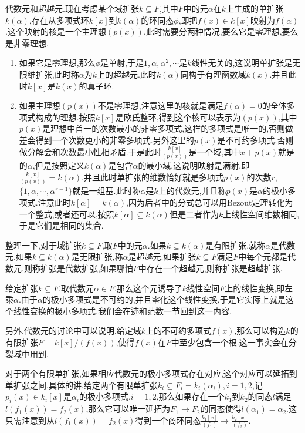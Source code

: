 代数元和超越元.现在考虑某个域扩张$k\subseteq F$,其中$F$中的元$\alpha$在$k$上生成的单扩张$k(\alpha)$,存在从多项式环$k[x]$到$k(\alpha)$的环同态$\phi$,即把$f(x)\in k[x]$映射为$f(\alpha)$.这个映射的核是一个主理想$(p(x))$,此时需要分两种情况,要么它是零理想,要么是非零理想.
\begin{enumerate}
	\item 如果它是零理想,那么$\phi$是单射,于是$1,\alpha,\alpha^2,\cdots$是$k$线性无关的,这说明单扩张是无限维扩张,此时称$\alpha$为$k$上的超越元.此时$k(\alpha)$同构于有理函数域$k(x)$.并且此时$k[x]$是$k(x)$的真子环.
	\item 如果主理想$(p(x))$不是零理想,注意这里的核就是满足$f(\alpha)=0$的全体多项式构成的理想.按照$k[x]$是欧氏整环,得到这个核可以表示为$(p(x))$,其中$p(x)$是理想中首一的次数最小的非零多项式,这样的多项式是唯一的,否则做差会得到一个次数更小的非零多项式.另外这里的$p(x)$是不可约多项式,否则做分解会和次数最小性相矛盾.于是此时$\frac{k[x]}{(p(x))}$是一个域,其中$x+p(x)$就是的$\alpha$,但是按照定义$k(\alpha)$是包含$\alpha$的最小域,这说明映射是满射,即$\frac{k[x]}{(p(x))}=k(\alpha)$.并且此时单扩张的维数恰好就是多项式$p(x)$的次数$r$,$\{1,\alpha,\cdots,\alpha^{r-1}\}$就是一组基.此时称$\alpha$是$k$上的代数元,并且称$p(x)$是$\alpha$的极小多项式.注意此时$k[\alpha]=k(\alpha)$,因为后者中的分式总可以用Bezout定理转化为一个整式,或者还可以,按照$k[\alpha]\subseteq k(\alpha)$但是二者作为$k$上线性空间维数相同,于是它们是相同的集合.
\end{enumerate}

整理一下,对于域扩张$k\subseteq F$,取$F$中的元$\alpha$.如果$k\subseteq k(\alpha)$是有限扩张,就称$\alpha$是代数元.如果$k\subseteq k(\alpha)$是无限扩张,称$\alpha$是超越元.如果扩张$k\subseteq F$满足$F$中每个元都是代数元,则称扩张是代数扩张,如果哪怕$F$中存在一个超越元,则称扩张是超越扩张.

给定扩张$k\subseteq F$,取代数元$\alpha\in F$,那么这个元诱导了$k$线性空间$F$上的线性变换,即左乘$\alpha$.由于$\alpha$的极小多项式是不可约的,并且零化这个线性变换,于是它实际上就是这个线性变换的极小多项式.我们会在迹和范数一节回到这一内容.

另外,代数元的讨论中可以说明,给定域$k$上的不可约多项式$f(x)$,那么可以构造$k$的有限扩张$F=k[x]/(f(x))$,使得$f(x)$在$F$中至少包含一个根.这一事实会在分裂域中用到.

对于两个有限单扩张,如果相应代数元的极小多项式存在对应,这个对应可以延拓到单扩张之间.具体的讲,给定两个有限单扩张$k_i\subseteq F_i=k_i(\alpha_i),i=1,2$,记$p_i(x)\in k_i[x]$是$\alpha_i$的极小多项式,$i=1,2$,那么如果存在一个$k_1$到$k_2$的同态$l$满足$l(f_1(x))=f_2(x)$,那么它可以唯一延拓为$F_1\to F_2$的同态使得$l(\alpha_1)=\alpha_2$.这只需注意到从$l(f_1(x))=f_2(x)$得到一个商环同态$\frac{k_1[x]}{(f_1)}\to\frac{k_2[x]}{(f_2)}$.

